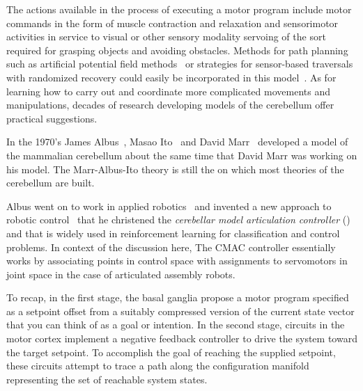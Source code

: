 The actions available in the process of executing a motor program include motor commands in the form of muscle contraction and relaxation and sensorimotor activities in service to visual {\emdash{}} or other sensory modality {\emdash{}} servoing of the sort required for grasping objects and avoiding obstacles. Methods for path planning such as artificial potential field methods~\cite{KhatibIJRR-86} or strategies for sensor-based traversals with randomized recovery could easily be incorporated in this model~\cite{LiarokapisetalICAR-15}. As for learning how to carry out and coordinate more complicated movements and manipulations, decades of research developing models of the cerebellum offer practical suggestions.


In the 1970's James Albus~\cite{AlbusMB-71}, Masao Ito~\cite{Ecclesetal1967neuronal} and David Marr~\cite{MarrJoP-69} developed a model of the mammalian cerebellum about the same time that David Marr was working on his model. The Marr-Albus-Ito theory {\emdash{}} is still the {} on which most theories of the cerebellum are built.

Albus went on to work in applied robotics~\cite{AlbusetalSME-84} and invented a new approach to robotic control~\cite{Albus75} that he christened the {\it{cerebellar model articulation controller}} ({}) and that is widely used in reinforcement learning for classification and control problems. In context of the discussion here, The CMAC controller essentially works by associating points in control space with assignments to servomotors in joint space in the case of articulated assembly robots.

To recap, in the first stage, the basal ganglia propose a motor program specified as a setpoint offset from a suitably compressed version of the current state vector that you can think of as a goal or intention. In the second stage, circuits in the motor cortex implement a negative feedback controller to drive the system toward the target setpoint. To accomplish the goal of reaching the supplied setpoint, these circuits attempt to trace a path along the configuration manifold representing the set of reachable system states.


